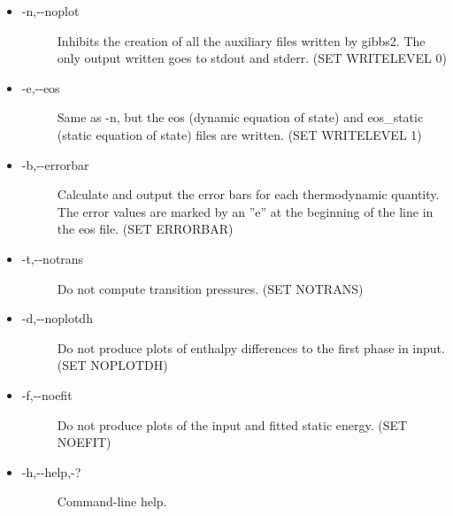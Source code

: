 \documentclass[a4paper]{article}
\begin{document}
\begin{itemize}
\item 
\begin{description}
\item[{-n,-{}-noplot}] \leavevmode 
Inhibits the creation of all the auxiliary files written by
gibbs2. The only output written goes to stdout and stderr.
(SET WRITELEVEL 0)

\end{description}

\item 
\begin{description}
\item[{-e,-{}-eos}] \leavevmode 
Same as -n, but the eos (dynamic equation of state) and
eos\_static (static equation of state) files are written.
(SET WRITELEVEL 1)

\end{description}

\item 
\begin{description}
\item[{-b,-{}-errorbar}] \leavevmode 
Calculate and output the error bars for each thermodynamic quantity.
The error values are marked by an ''e'' at the beginning of the line in
the eos file.
(SET ERRORBAR)

\end{description}

\item 
\begin{description}
\item[{-t,-{}-notrans}] \leavevmode 
Do not compute transition pressures.
(SET NOTRANS)

\end{description}

\item 
\begin{description}
\item[{-d,-{}-noplotdh}] \leavevmode 
Do not produce plots of enthalpy differences to the first phase in input.
(SET NOPLOTDH)

\end{description}

\item 
\begin{description}
\item[{-f,-{}-noefit}] \leavevmode 
Do not produce plots of the input and fitted static energy.
(SET NOEFIT)

\end{description}

\item 
\begin{description}
\item[{-h,-{}-help,-?}] \leavevmode 
Command-line help.

\end{description}
\end{itemize}
\end{document}
